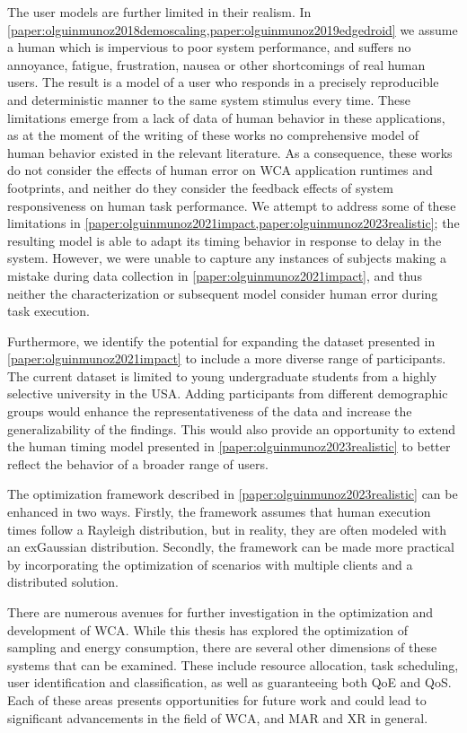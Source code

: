 The user models are further limited in their realism.
In \cref{paper:olguinmunoz2018demoscaling,paper:olguinmunoz2019edgedroid} we assume a human which is impervious to poor system performance, and suffers no annoyance, fatigue, frustration, nausea or other shortcomings of real human users.
The result is a model of a user who responds in a precisely reproducible and deterministic manner to the same system stimulus every time.
These limitations emerge from a lack of data of human behavior in these applications, as at the moment of the writing of these works no comprehensive model of human behavior existed in the relevant literature.
As a consequence, these works do not consider the effects of human error on \gls{WCA} application runtimes and footprints, and neither do they consider the feedback effects of system responsiveness on human task performance.
We attempt to address some of these limitations in \cref{paper:olguinmunoz2021impact,paper:olguinmunoz2023realistic};
the resulting model is able to adapt its timing behavior in response to delay in the system.
However, we were unable to capture any instances of subjects making a mistake during data collection in \cref{paper:olguinmunoz2021impact}, and thus neither the characterization or subsequent model consider human error during task execution.

Furthermore, we identify the potential for expanding the dataset presented in \cref{paper:olguinmunoz2021impact} to include a more diverse range of participants.
The current dataset is limited to young undergraduate students from a highly selective university in the \gls{USA}.
Adding participants from different demographic groups would enhance the representativeness of the data and increase the generalizability of the findings.
This would also provide an opportunity to extend the human timing model presented in \cref{paper:olguinmunoz2023realistic} to better reflect the behavior of a broader range of users.

The optimization framework described in \cref{paper:olguinmunoz2023realistic} can be enhanced in two ways.
Firstly, the framework assumes that human execution times follow a Rayleigh distribution, but in reality, they are often modeled with an \gls{exGaussian} distribution.
Secondly, the framework can be made more practical by incorporating the optimization of scenarios with multiple clients and a distributed solution.

There are numerous avenues for further investigation in the optimization and development of \gls{WCA}.
While this thesis has explored the optimization of sampling and energy consumption, there are several other dimensions of these systems that can be examined.
These include resource allocation, task scheduling, user identification and classification, as well as guaranteeing both \gls{QoE} and \gls{QoS}.
Each of these areas presents opportunities for future work and could lead to significant advancements in the field of \gls{WCA}, and \gls{MAR} and \gls{XR} in general.

